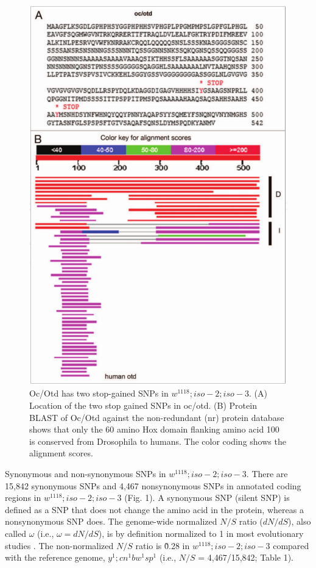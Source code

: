 \begin{figure}
    \centering
    \includegraphics[width=14cm]{snpeff_fig3.png}
    \caption{Oc/Otd has two stop-gained SNPs in $w^{1118} ; iso-2; iso-3$. (A) Location of the two stop gained SNPs in oc/otd. (B) Protein BLAST of Oc/Otd against the non-redundant (nr) protein database shows that only the 60 amino Hox domain flanking amino acid 100 is conserved from Drosophila to humans. The color coding shows the alignment scores.}
    \label{fig:snpeffTab3}
\end{figure}

Synonymous and non-synonymous SNPs in $w^{1118} ; iso-2; iso-3$. There are 15,842 synonymous SNPs and 4,467 nonsynonymous SNPs in annotated coding regions in $w^{1118} ; iso-2; iso-3$ (Fig. 1). A synonymous SNP (silent SNP) is defined as a SNP that does not change the amino acid in the protein, whereas a nonsynonymous SNP does. The genome-wide normalized $N/S$ ratio ($dN/dS$), also called $\omega$ (i.e., $\omega = dN/dS$), is by definition normalized to 1 in most evolutionary studies \cite{stoletzki2011positive}. The non-normalized $N/S$ ratio is \~0.28 in $w^{1118} ; iso-2; iso-3$ compared with the reference genome, $y^1 ; cn^1 bw^1 sp^1$ (i.e., $N/S$ = 4,467/15,842; Table 1).

